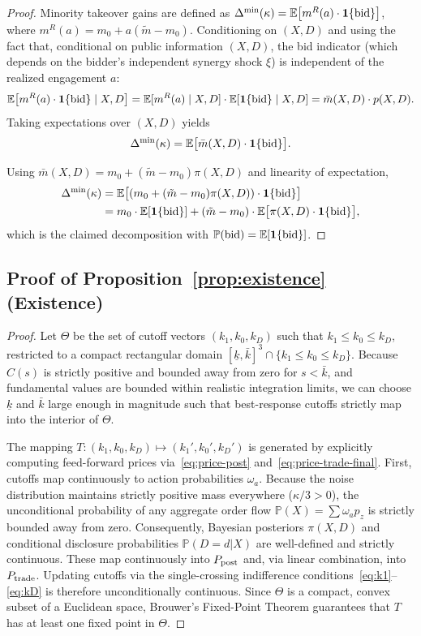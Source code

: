 \documentclass[11pt]{article}
\newcommand{\E}{\mathbb{E}}
\newcommand{\PP}{\mathbb{P}}
\newcommand{\1}{\mathbf{1}}
\begin{document}
\begin{proof}
  Minority takeover gains are defined as $\Delta^{\min}(\kappa)=\E\big[m^{R}(a)\cdot \1\{\textup{bid}\}\big]$, where $m^R(a)=m_0+a(\tilde m - m_0)$.
  Conditioning on $(X,D)$ and using the fact that, conditional on public information $(X,D)$, the bid indicator (which depends on the bidder's independent synergy shock $\xi$) is independent of the realized engagement $a$:
  \[
  \E\big[m^{R}(a)\cdot \1\{\textup{bid}\}\mid X,D\big]
  =\E[m^{R}(a)\mid X,D]\cdot \E[\1\{\textup{bid}\}\mid X,D]
  =\bar m(X,D)\cdot p(X,D).
  \]
  Taking expectations over $(X,D)$ yields
  \[
  \Delta^{\min}(\kappa)=\E\big[\bar m(X,D)\cdot \1\{\textup{bid}\}\big].
  \]

  Using $\bar{m}(X,D)=m_0+(\tilde{m}-m_0)\pi(X,D)$ and linearity of expectation,
  \begin{align*}
  \Delta^{\min}(\kappa)
  &=\E\big[(m_0+(\tilde{m}-m_0)\pi(X,D))\cdot \1\{\textup{bid}\}\big] \\
  &=m_0\cdot \E[\1\{\textup{bid}\}] + (\tilde{m}-m_0)\cdot \E\big[\pi(X,D)\cdot \1\{\textup{bid}\}\big],
  \end{align*}
  which is the claimed decomposition with $\PP(\textup{bid})=\E[\1\{\textup{bid}\}]$.
\end{proof}

\subsection{Proof of Proposition~\ref{prop:existence} (Existence)}
\label{app:proof-existence}

\begin{proof}
Let $\Theta$ be the set of cutoff vectors $(k_1,k_0,k_D)$ such that $k_1\le k_0\le k_D$, restricted to a compact rectangular domain $[\underline{k},\bar{k}]^3\cap\{k_1\le k_0\le k_D\}$. Because $C(s)$ is strictly positive and bounded away from zero for $s<\bar{k}$, and fundamental values are bounded within realistic integration limits, we can choose $\underline{k}$ and $\bar{k}$ large enough in magnitude such that best-response cutoffs strictly map into the interior of $\Theta$.

The mapping $T:(k_1,k_0,k_D)\mapsto (k_1',k_0',k_D')$ is generated by explicitly computing feed-forward prices via~\eqref{eq:price-post} and~\eqref{eq:price-trade-final}. First, cutoffs map continuously to action probabilities $\omega_a$. Because the noise distribution maintains strictly positive mass everywhere ($\kappa/3 > 0$), the unconditional probability of any aggregate order flow $\PP(X) = \sum \omega_a p_z$ is strictly bounded away from zero. Consequently, Bayesian posteriors $\pi(X,D)$ and conditional disclosure probabilities $\PP(D=d|X)$ are well-defined and strictly continuous. These map continuously into $P_{\textup{post}}$ and, via linear combination, into $P_{\textup{trade}}$. Updating cutoffs via the single-crossing indifference conditions~\eqref{eq:k1}--\eqref{eq:kD} is therefore unconditionally continuous. Since $\Theta$ is a compact, convex subset of a Euclidean space, Brouwer's Fixed-Point Theorem guarantees that $T$ has at least one fixed point in $\Theta$.
\end{proof}
\end{document}
